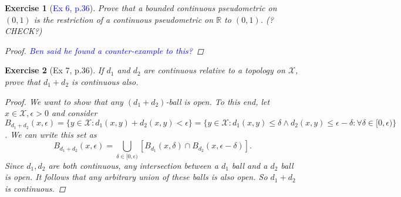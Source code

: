 \documentclass[11pt]{article}
\newtheorem{exercise}{Exercise}
\newcommand{\R}{\mathbb{R}}
\newcommand{\X}{\mathcal{X}}
\newcommand{\lb}{\left[}
\newcommand{\rb}{\right]}
\begin{document}
\begin{exercise}[\textcolor{blue}{Ex 6, p.36}]
	Prove that a bounded continuous pseudometric on $(0, 1)$ is the restriction of a continuous pseudometric on $\R$ to $(0, 1)$. (?CHECK?)
	\begin{proof}
		\textcolor{blue}{Ben said he found a counter-example to this?}
	\end{proof}
\end{exercise}

\begin{exercise}[Ex 7, p.36]
	If $d_1$ and $d_2$ are continuous relative to a topology on $\X$, prove that $d_1 + d_2$ is continuous also.
	\begin{proof}
		We want to show that any $(d_1+d_2)$-ball is open. To this end, let $x\in \X, \epsilon > 0$ and consider $B_{d_1 + d_2}(x,\epsilon) = \{ y \in \X : d_1(x,y) + d_2(x,y) < \epsilon \} = \{ y \in \X : d_1(x,y) \leq \delta \land d_2(x,y) \leq \epsilon - \delta : \forall \delta \in [0,\epsilon) \}$. We can write this set as
		\begin{equation*}
		B_{d_1 + d_2}(x,\epsilon) = \bigcup_{\delta\in [0,\epsilon)} \lb B_{d_1}(x,\delta) \cap B_{d_2}(x,\epsilon - \delta) \rb.
		\end{equation*} 
		Since $d_1,d_2$ are both continuous, any intersection between a $d_1$ ball and a $d_2$ ball is open. It follows that any arbitrary union of these balls is also open. So $d_1 + d_2$ is continuous. 
	\end{proof}

\end{exercise}
\end{document}
